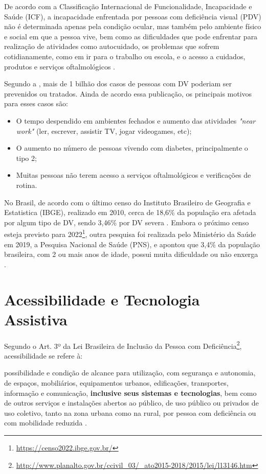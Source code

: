De acordo com a Classificação Internacional de Funcionalidade, Incapacidade e Saúde (ICF),
a incapacidade enfrentada por pessoas com deficiência visual (PDV) não é determinada apenas
pela condição ocular, mas também pelo ambiente físico e social em que a pessoa vive, bem como
as dificuldades que pode enfrentar para realização de atividades como autocuidado, os problemas
que sofrem cotidianamente, como em ir para o trabalho ou escola, e o acesso a cuidados, produtos
e serviços oftalmológicos \cite{WHO2019}.

Segundo a , mais de 1 bilhão dos casos de pessoas com DV poderiam ser prevenidos ou
tratados. Ainda de acordo essa publicação, os principais motivos para esses casos são:

\begin{itemize}
    \item O tempo despendido em ambientes fechados e aumento das atividades \textit{"near work"} (ler, escrever, assistir TV, jogar videogames, etc);
    \item O aumento no número de pessoas vivendo com diabetes, principalmente o tipo 2;
    \item Muitas pessoas não terem acesso a serviços oftalmológicos e verificações de rotina.
\end{itemize}

No Brasil, de acordo com o último censo do Instituto Brasileiro de Geografia e Estatistica (IBGE), realizado em 2010,
cerca de 18,6\% da população era afetada por algum tipo de DV, sendo 3,46\% por DV severa
\cite{IBGE2012}. Embora o próximo censo esteja previsto para 2022\footnote{\url{https://censo2022.ibge.gov.br/}}, outra pesquisa
foi realizada pelo Ministério da Saúde em 2019, a Pesquisa Nacional de Saúde (PNS), e apontou que 3,4\% da população brasileira,
com 2 ou mais anos de idade, possui muita dificuldade ou não enxerga \cite{stopa2020pesquisa}.

\section{Acessibilidade e Tecnologia Assistiva}

Segundo o Art. 3º da Lei Brasileira de Inclusão da Pessoa com Deficiência\footnote{\url{http://www.planalto.gov.br/ccivil_03/_ato2015-2018/2015/lei/l13146.htm}},
acessibilidade se refere à:

\begin{citacao}
    possibilidade e condição de alcance para utilização, com segurança e autonomia, de espaços, mobiliários, equipamentos urbanos,
    edificações, transportes, informação e comunicação, \textbf{inclusive seus sistemas e tecnologias}, bem como de outros serviços e
    instalações abertos ao público, de uso público ou privados de uso coletivo, tanto na zona urbana como na rural, por pessoa com
    deficiência ou com mobilidade reduzida \cite{Brasil2015}.
\end{citacao}

